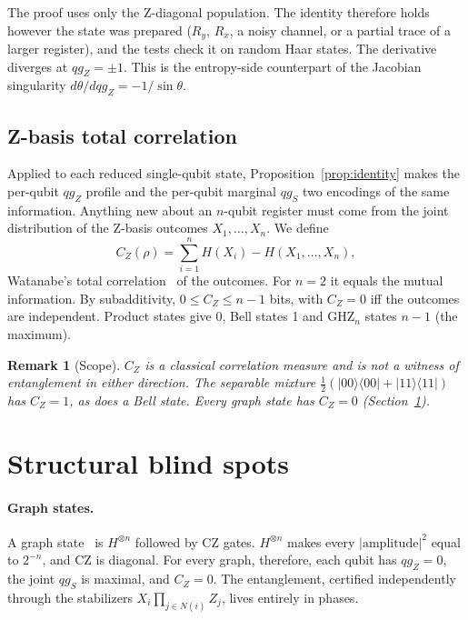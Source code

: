 \documentclass[11pt]{article}
\newtheorem{remark}{Remark}
\newcommand{\qgZ}{qg_Z}
\newcommand{\qgS}{qg_S}
\begin{document}
The proof uses only the Z-diagonal population. The identity therefore holds however the state was
prepared ($R_y$, $R_x$, a noisy channel, or a partial trace of a larger register), and the tests check it on random
Haar states. The derivative diverges at $\qgZ=\pm1$. This is the entropy-side counterpart of the
Jacobian singularity $d\theta/d\qgZ=-1/\sin\theta$.

\subsection{Z-basis total correlation}

Applied to each reduced single-qubit state, Proposition~\ref{prop:identity} makes the per-qubit
$\qgZ$ profile and the per-qubit marginal $\qgS$ two encodings of the same information. Anything
new about an $n$-qubit register must come from the joint distribution of the Z-basis outcomes
$X_1,\dots,X_n$. We define
\begin{equation}
  C_Z(\rho)=\sum_{i=1}^n H(X_i)-H(X_1,\dots,X_n),
\end{equation}
Watanabe's total correlation~\cite{watanabe1960} of the outcomes. For $n=2$ it equals the mutual
information. By subadditivity, $0\le C_Z\le n-1$ bits, with $C_Z=0$ iff the outcomes are
independent. Product states give 0, Bell states 1 and GHZ$_n$ states $n-1$ (the maximum).

\begin{remark}[Scope]
$C_Z$ is a classical correlation measure and is not a witness of entanglement in either direction.
The separable mixture $\tfrac12(|00\rangle\langle00|+|11\rangle\langle11|)$ has $C_Z=1$, as does a
Bell state. Every graph state has $C_Z=0$ (Section~\ref{sec:blind}).
\end{remark}

\section{Structural blind spots}\label{sec:blind}

\paragraph{Graph states.} A graph state~\cite{hein2004graph} is $H^{\otimes n}$ followed by CZ gates.
$H^{\otimes n}$ makes every $|\text{amplitude}|^2$ equal to $2^{-n}$, and CZ is diagonal. For every
graph, therefore, each qubit has $\qgZ=0$, the joint $\qgS$ is maximal, and $C_Z=0$. The entanglement,
certified independently through the stabilizers $X_i\prod_{j\in N(i)}Z_j$, lives entirely in phases.
\end{document}
